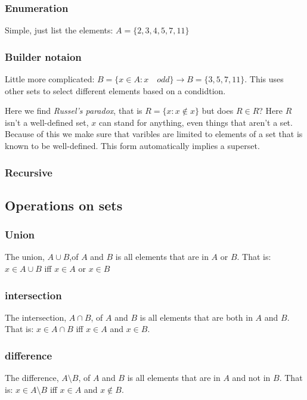 \documentclass[12pt]{article} %
\begin{document}
\subsubsection{Enumeration}
Simple, just list the elements: $A = \{2,3,4,5,7,11\}$

\subsubsection{Builder notaion}
Little more complicated: $B = \{x \in A: x \quad odd\} \rightarrow B = \{3,5,7,11\}$. This uses other sets to select different elements based on a condidtion. 

\par Here we find \textit{Russel's paradox}, that is $R = \{x: x\notin x\}$ but does $R \in R$? Here $R$ isn't a well-defined set, $x$ can stand for anything, even things that aren't a set. Because of this we make sure that varibles are limited to elements of a set that is known to be well-defined. This form automatically implies a superset.

\subsubsection{Recursive}

\subsection{Operations on sets}
\subsubsection{Union}
The union, $A \cup B$,of $A$ and $B$ is all elements that are in $A$ or $B$. That is: $x \in A \cup B$ iff $x \in A$ or $x \in B$

\subsubsection{intersection}
The intersection, $A \cap B$, of $A$ and $B$ is all elements that are both in $A$ and $B$. That is: $x \in A \cap B$ iff $x \in A$ and $x \in B$.

\subsubsection{difference}
The difference, $A \setminus B$, of $A$ and $B$ is all elements that are in $A$ and not in $B$. That is: $x \in A \setminus B$ iff $x \in A$ and $x \notin B$.
\end{document}
